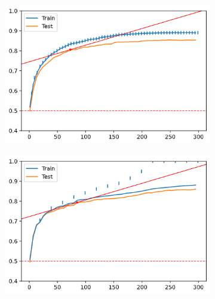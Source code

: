 \begin{figure}[H]
\begin{subfigure}[b]{0.32\linewidth}
    \end{subfigure}
    \begin{subfigure}[b]{0.32\linewidth}
        \includegraphics[width=\linewidth]{img/300-s5-p05-pre.png}
    \end{subfigure}
    \begin{subfigure}[b]{0.32\linewidth}
        \includegraphics[width=\linewidth]{img/300-s20-p01.png}
    \end{subfigure}
    \begin{subfigure}[b]{0.32\linewidth}

\end{subfigure}
\end{figure}

